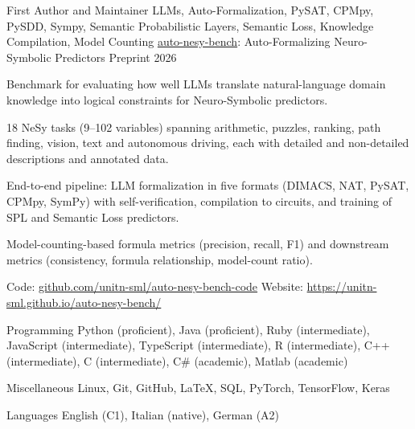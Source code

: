 \documentclass[11pt, a4paper]{awesome-cv}
\begin{document}
\begin{cventries}
  \cventry
    {First Author and Maintainer \textbullet{} LLMs, Auto-Formalization, PySAT, CPMpy, PySDD, Sympy, Semantic Probabilistic Layers, Semantic Loss, Knowledge Compilation, Model Counting} %
    {\href{https://unitn-sml.github.io/auto-nesy-bench/}{auto-nesy-bench}: Auto-Formalizing Neuro-Symbolic Predictors} %
    {Preprint} %
    {2026} %
    {
      \begin{cvitems}
        \item {Benchmark for evaluating how well LLMs translate natural-language domain knowledge into logical constraints for Neuro-Symbolic predictors.}
        \item {18 NeSy tasks (9--102 variables) spanning arithmetic, puzzles, ranking, path finding, vision, text and autonomous driving, each with detailed and non-detailed descriptions and annotated data.}
        \item {End-to-end pipeline: LLM formalization in five formats (DIMACS, NAT, PySAT, CPMpy, SymPy) with self-verification, compilation to circuits, and training of SPL and Semantic Loss predictors.}
        \item {Model-counting-based formula metrics (precision, recall, F1) and downstream metrics (consistency, formula relationship, model-count ratio).}
        \item {Code: \href{https://github.com/unitn-sml/auto-nesy-bench-code}{github.com/unitn-sml/auto-nesy-bench-code} \textbullet{} Website: \href{https://unitn-sml.github.io/auto-nesy-bench/}{https://unitn-sml.github.io/auto-nesy-bench/}}
      \end{cvitems}
    }

\end{cventries}

\begin{cvskills}

  \cvskill
    {Programming} %
    {Python (proficient), Java (proficient), Ruby (intermediate), JavaScript (intermediate), TypeScript (intermediate), \newline R (intermediate), C++ (intermediate), C (intermediate), C\# (academic), Matlab (academic)} %

  \cvskill
    {Miscellaneous} %
    {Linux, Git, GitHub, LaTeX, SQL, PyTorch, TensorFlow, Keras} %

  \cvskill
    {Languages} %
    {English (C1), Italian (native), German (A2)} %

\end{cvskills}
\end{document}
